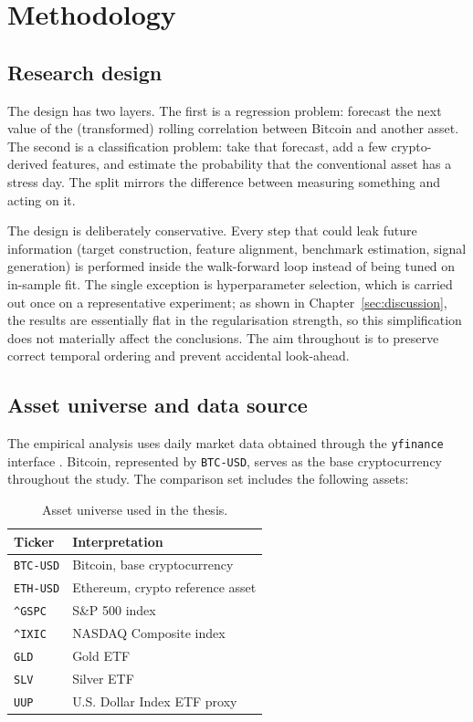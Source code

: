 \section{Methodology}

\subsection{Research design}

The design has two layers. The first is a regression problem: forecast the next value of the (transformed) rolling correlation between Bitcoin and another asset. The second is a classification problem: take that forecast, add a few crypto-derived features, and estimate the probability that the conventional asset has a stress day. The split mirrors the difference between measuring something and acting on it.

The design is deliberately conservative. Every step that could leak future information (target construction, feature alignment, benchmark estimation, signal generation) is performed inside the walk-forward loop instead of being tuned on in-sample fit. The single exception is hyperparameter selection, which is carried out once on a representative experiment; as shown in Chapter~\ref{sec:discussion}, the results are essentially flat in the regularisation strength, so this simplification does not materially affect the conclusions. The aim throughout is to preserve correct temporal ordering and prevent accidental look-ahead.

\subsection{Asset universe and data source}

The empirical analysis uses daily market data obtained through the \texttt{yfinance} interface \cite{yfinance2026}. Bitcoin, represented by \texttt{BTC-USD}, serves as the base cryptocurrency throughout the study. The comparison set includes the following assets:

\begin{table}[H]
    \centering
    \caption{Asset universe used in the thesis.}
    \label{tab:asset_universe}
    \begin{tabular}{ll}
        \toprule
        Ticker & Interpretation \\
        \midrule
        \texttt{BTC-USD} & Bitcoin, base cryptocurrency \\
        \texttt{ETH-USD} & Ethereum, crypto reference asset \\
        \texttt{\textasciicircum{}GSPC} & S\&P 500 index \\
        \texttt{\textasciicircum{}IXIC} & NASDAQ Composite index \\
        \texttt{GLD} & Gold ETF \\
        \texttt{SLV} & Silver ETF \\
        \texttt{UUP} & U.S. Dollar Index ETF proxy \\
        \bottomrule
    \end{tabular}
\end{table}

